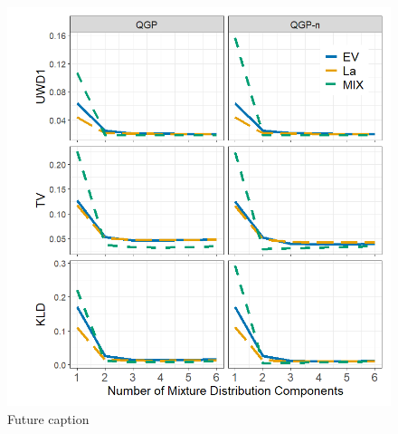 \documentclass[preprint,12pt,authoryear]{elsarticle}
\begin{document}
\begin{figure}[hbt!]
\centering
  \includegraphics[]{Images/mix_comps.png}
\caption{Future caption}
\label{fig:mix_comps}
\end{figure}


\end{document}
